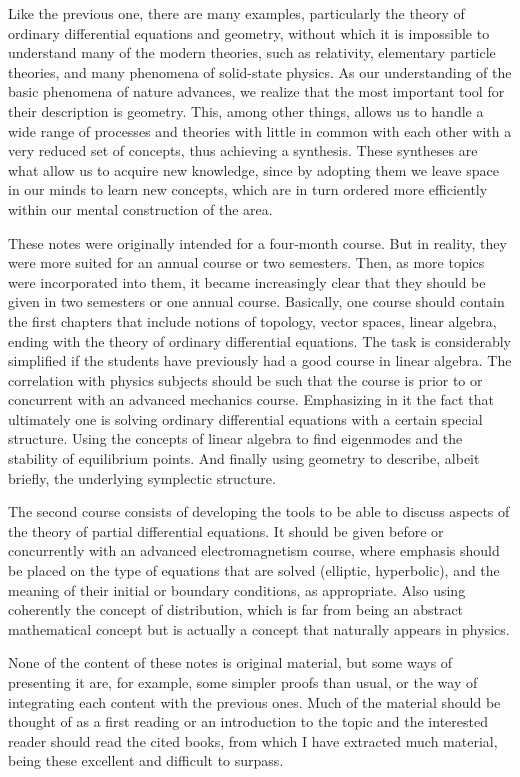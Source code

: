 Like the previous one, there are many examples, particularly the theory of ordinary differential equations and geometry, without which it is impossible to understand many of the modern theories, such as relativity, elementary particle theories, and many phenomena of solid-state physics. As our understanding of the basic phenomena of nature advances, we realize that the most important tool for their description is geometry. This, among other things, allows us to handle a wide range of processes and theories with little in common with each other with a very reduced set of concepts, thus achieving a synthesis. These syntheses are what allow us to acquire new knowledge, since by adopting them we leave space in our minds to learn new concepts, which are in turn ordered more efficiently within our mental construction of the area.

These notes were originally intended for a four-month course. But in reality, they were more suited for an annual course or two semesters. Then, as more topics were incorporated into them, it became increasingly clear that they should be given in two semesters or one annual course. Basically, one course should contain the first chapters that include notions of topology, vector spaces, linear algebra, ending with the theory of ordinary differential equations. The task is considerably simplified if the students have previously had a good course in linear algebra. The correlation with physics subjects should be such that the course is prior to or concurrent with an advanced mechanics course. Emphasizing in it the fact that ultimately one is solving ordinary differential equations with a certain special structure. Using the concepts of linear algebra to find eigenmodes and the stability of equilibrium points. And finally using geometry to describe, albeit briefly, the underlying symplectic structure.

The second course consists of developing the tools to be able to discuss aspects of the theory of partial differential equations. It should be given before or concurrently with an advanced electromagnetism course, where emphasis should be placed on the type of equations that are solved (elliptic, hyperbolic), and the meaning of their initial or boundary conditions, as appropriate. Also using coherently the concept of distribution, which is far from being an abstract mathematical concept but is actually a concept that naturally appears in physics.

None of the content of these notes is original material, but some ways of presenting it are, for example, some simpler proofs than usual, or the way of integrating each content with the previous ones. Much of the material should be thought of as a first reading or an introduction to the topic and the interested reader should read the cited books, from which I have extracted much material, being these excellent and difficult to surpass.
